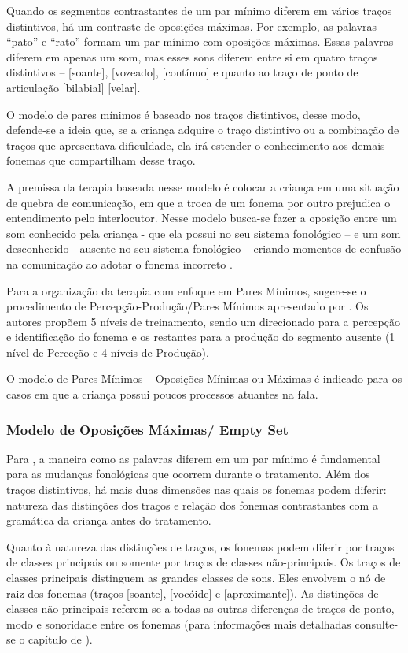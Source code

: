 \documentclass[output=paper,colorlinks,citecolor=brown,booklanguage=portuguese]{langscibook}
\begin{document}
Quando os segmentos contrastantes de um par mínimo diferem em vários traços distintivos, há um contraste de oposições máximas. Por exemplo, as palavras “pato” e “rato” formam um par mínimo com oposições máximas. Essas palavras diferem em apenas um som, mas esses sons diferem entre si em quatro traços distintivos – [soante], [vozeado], [contínuo] e quanto ao traço de ponto de articulação [bilabial] [velar]. 

O modelo de pares mínimos é baseado nos traços distintivos, desse modo, defende-se a ideia que, se a criança adquire o traço distintivo ou a combinação de traços que apresentava dificuldade, ela irá estender o conhecimento aos demais fonemas que compartilham desse traço.  

A premissa da terapia baseada nesse modelo é colocar a criança em uma situação de quebra de comunicação, em que a troca de um fonema por outro prejudica o entendimento pelo interlocutor. Nesse modelo busca-se fazer a oposição entre um som conhecido pela criança - que ela possui no seu sistema fonológico -- e um som desconhecido - ausente no seu sistema fonológico -- criando momentos de confusão na comunicação ao adotar o fonema incorreto \citep{Weiner1981}. 

Para a organização da terapia com enfoque em Pares Mínimos, sugere-se o procedimento de Percepção-Produção/Pares Mínimos apresentado por \citet{Tyler1987}. Os autores propõem 5 níveis de treinamento, sendo um direcionado para a percepção e identificação do fonema e os restantes para a produção do segmento ausente (1 nível de Perceção e 4 níveis de Produção). 

O modelo de Pares Mínimos -- Oposições Mínimas ou Máximas é indicado para os casos em que a criança possui poucos processos atuantes na fala.

\subsubsection{Modelo de Oposições Máximas/ Empty Set}\label{sec:cap5sec2doistres}
Para \citet{Gierut1992}, a maneira como as palavras diferem em um par mínimo é fundamental para as mudanças fonológicas que ocorrem durante o tratamento. Além dos traços distintivos, há mais duas dimensões nas quais os fonemas podem diferir: natureza das distinções dos traços e relação dos fonemas contrastantes com a gramática da criança antes do tratamento.

Quanto à natureza das distinções de traços, os fonemas podem diferir por traços de classes principais ou somente por traços de classes não-principais. Os traços de classes principais distinguem as grandes classes de sons. Eles envolvem o nó de raiz dos fonemas (traços [soante], [vocóide] e [aproximante]). As distinções de classes não-principais referem-se a todas as outras diferenças de traços de ponto, modo e sonoridade entre os fonemas (para informações mais detalhadas consulte-se o capítulo de ).
\end{document}

